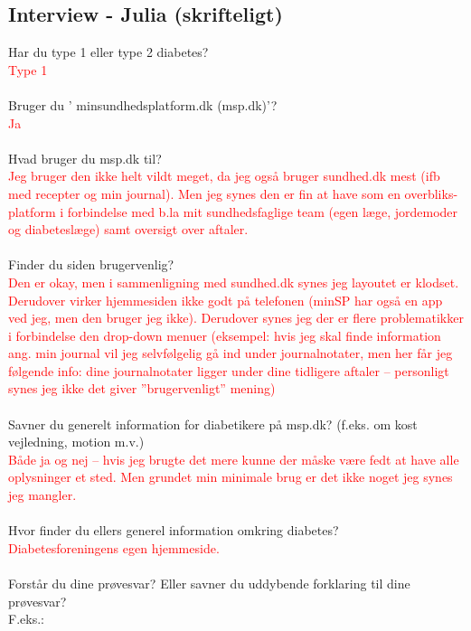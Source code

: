 \subsection{Interview - Julia (skrifteligt)}
Har du type 1 eller type 2 diabetes?\\
\textcolor{red}{Type 1} 
\\ \\
Bruger  du ’ minsundhedsplatform.dk (msp.dk)’?\\
\textcolor{red}{Ja}   
\\ \\
Hvad bruger du msp.dk til?\\
\textcolor{red}{Jeg bruger den ikke helt vildt meget, da jeg også bruger sundhed.dk mest (ifb med recepter og min journal). Men jeg synes den er fin at have som en overbliks-platform i forbindelse med b.la mit sundhedsfaglige team (egen læge, jordemoder og diabeteslæge) samt oversigt over aftaler.}
\\ \\
Finder du siden brugervenlig?\\
\textcolor{red}{Den er okay, men i sammenligning med sundhed.dk synes jeg layoutet er klodset. Derudover virker hjemmesiden ikke godt på telefonen (minSP har også en app ved jeg, men den bruger jeg ikke). Derudover synes jeg der er flere problematikker i forbindelse den drop-down menuer (eksempel: hvis jeg skal finde information ang. min journal vil jeg selvfølgelig gå ind under journalnotater, men her får jeg følgende info: dine journalnotater ligger under  dine tidligere aftaler – personligt synes jeg ikke det giver ”brugervenligt” mening)}
\\ \\
Savner du generelt information for diabetikere på msp.dk? (f.eks. om kost vejledning, motion m.v.)\\
\textcolor{red}{Både ja og nej – hvis jeg brugte det mere kunne der måske være fedt at have alle oplysninger et sted. Men grundet min minimale brug er det ikke noget jeg synes jeg mangler.}
\\ \\
Hvor finder du ellers generel information omkring diabetes?\\
\textcolor{red}{Diabetesforeningens egen hjemmeside.}
\\ \\
Forstår du dine prøvesvar? Eller savner du uddybende forklaring til dine prøvesvar?\\
             F.eks.:  \\
